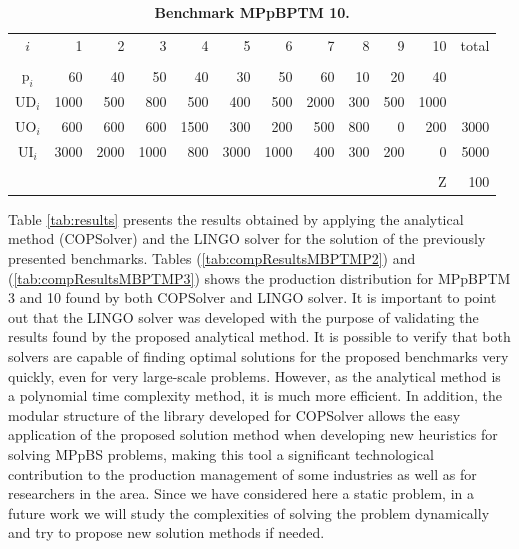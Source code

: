 \documentclass[10pt,fleqn,a4paper,twoside]{article}
\begin{document}
\begin{table}[h!]
\begin{center}
\caption{\textbf{Benchmark MPpBPTM 10.}}
\begin{small}
\begin{tabular}[c]{c r r r r r r r r r r r }
\\
$i$ & 1 & 2 & 3 & 4 & 5 & 6 & 7 & 8 & 9 & 10 & total \\
\cline {1-12} \\
$\textrm{p}_i$ & 60 & 40 & 50 & 40 & 30 & 50 & 60 & 10 & 20 & 40\\
$\textrm{UD}_i$ & 1000 & 500 & 800 & 500 & 400 & 500 & 2000 & 300 & 500 & 1000 \\
$\textrm{UO}_i$ & 600 & 600 & 600 & 1500 & 300 & 200 & 500 & 800 & 0 & 200 & 3000 \\
$\textrm{UI}_i$ & 3000 & 2000 & 1000 & 800 & 3000 & 1000 & 400 & 300 & 200 & 0 & 5000 \\
\cline {1-12} \\
& & & & & & & & & & $\textrm{Z}$ & 100 \\
\end{tabular}
\label{tab:MBPTMP003}
\end{small}
\end{center}
\end{table}

Table \ref{tab:results} presents the results obtained by applying the analytical method (COPSolver) and the LINGO solver for the solution of the previously presented benchmarks. Tables (\ref{tab:compResultsMBPTMP2}) and (\ref{tab:compResultsMBPTMP3}) shows the production distribution for MPpBPTM 3 and 10 found by both COPSolver and LINGO solver. It is important to point out that the LINGO solver was developed with the purpose of validating the results found by the proposed analytical method. It is possible to verify that both solvers are capable of finding optimal solutions for the proposed benchmarks very quickly, even for very large-scale problems. However, as the analytical method is a polynomial time complexity method, it is much more efficient. In addition, the modular structure of the library developed for COPSolver allows the easy application of the proposed solution method when developing new heuristics for solving MPpBS problems, making this tool a significant technological contribution to the production management of some industries as well as for researchers in the area. Since we have considered here a static problem, in a future work we will study the complexities of solving the problem dynamically and try to propose new solution methods if needed. 
\end{document}
